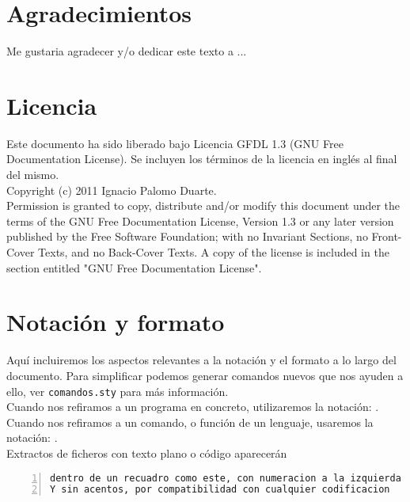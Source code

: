 

\section*{Agradecimientos}

Me gustaria agradecer y/o dedicar este texto a ...

\cleardoublepage

\section*{Licencia} %

Este documento ha sido liberado bajo Licencia GFDL 1.3 (GNU Free
Documentation License). Se incluyen los términos de la licencia en
inglés al final del mismo.\\

Copyright (c) 2011 Ignacio Palomo Duarte.\\

Permission is granted to copy, distribute and/or modify this document under the
terms of the GNU Free Documentation License, Version 1.3 or any later version
published by the Free Software Foundation; with no Invariant Sections, no
Front-Cover Texts, and no Back-Cover Texts. A copy of the license is included in
the section entitled "GNU Free Documentation License".\\

\cleardoublepage

\section*{Notación y formato}

Aquí incluiremos los aspectos relevantes a la notación y el formato a
lo largo del documento. Para simplificar podemos generar comandos
nuevos que nos ayuden a ello, ver \texttt{comandos.sty} para más
información. \\

Cuando nos refiramos a un programa en concreto, utilizaremos la
notación: .\\

Cuando nos refiramos a un comando, o función de un lenguaje, usaremos
la notación: .\\

Extractos de ficheros con texto plano o código aparecerán

\begin{lstlisting}[caption={[]Ejemplo de listado}, numbers=left]
dentro de un recuadro como este, con numeracion a la izquierda
Y sin acentos, por compatibilidad con cualquier codificacion
\end{lstlisting}
